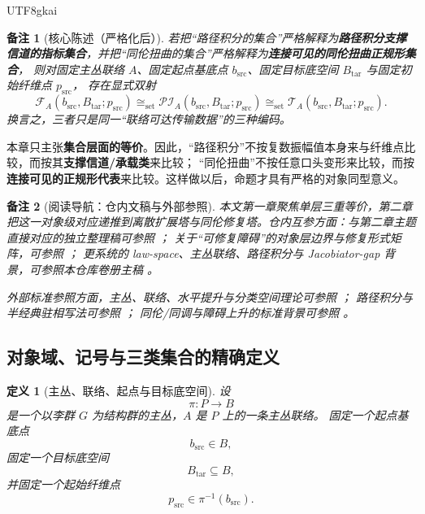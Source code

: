 \documentclass[12pt]{article}
\newtheorem{definition}{定义}[section]
\newtheorem{remark}{备注}[section]
\begin{document}
\begin{CJK*}{UTF8}{gkai}
\begin{remark}[核心陈述（严格化后）]
若把“路径积分的集合”严格解释为\textbf{路径积分支撑信道的指标集合}，并把“同伦扭曲的集合”严格解释为\textbf{连接可见的同伦扭曲正规形集合}，
则对固定主丛联络 $A$、固定起点基底点 $b_{\mathrm{src}}$、固定目标底空间 $B_{\mathrm{tar}}$ 与固定初始纤维点 $p_{\mathrm{src}}$，
存在显式双射
\[
  \mathcal{F}_{A}(b_{\mathrm{src}},B_{\mathrm{tar}};p_{\mathrm{src}})
  \cong_{\mathrm{set}}
  \mathcal{PI}_{A}(b_{\mathrm{src}},B_{\mathrm{tar}};p_{\mathrm{src}})
  \cong_{\mathrm{set}}
  \mathcal{T}_{A}(b_{\mathrm{src}},B_{\mathrm{tar}};p_{\mathrm{src}}).
\]
换言之，三者只是同一“联络可达传输数据”的三种编码。
\end{remark}

本章只主张\textbf{集合层面的等价}。因此，“路径积分”不按复数振幅值本身来与纤维点比较，而按其\textbf{支撑信道/承载类}来比较；
“同伦扭曲”不按任意口头变形来比较，而按\textbf{连接可见的正规形代表}来比较。这样做以后，命题才具有严格的对象同型意义。

\begin{remark}[阅读导航：仓内文稿与外部参照]
本文第一章聚焦单层三重等价，第二章把这一对象级对应递推到离散扩展塔与同伦修复塔。仓内互参方面：与第二章主题直接对应的独立整理稿可参照 \cite{RepoTex35Tower}；
关于“可修复障碍”的对象层边界与修复形式矩阵，可参照 \cite{RepoTex29RepairableObstruction}；
更系统的 law-space、主丛联络、路径积分与 Jacobiator-gap 背景，可参照本仓库卷册主稿 \cite{GaoZhengAppVol3}。

外部标准参照方面，主丛、联络、水平提升与分类空间理论可参照 \cite{KobayashiNomizu1963Foundations,Husemoller1994FibreBundles,Hall2015LieGroups}；
路径积分与半经典驻相写法可参照 \cite{FeynmanHibbs1965QMPI,Schulman2005Technique}；
同伦/同调与障碍上升的标准背景可参照 \cite{Hatcher2002AT,Whitehead1978Elements,Weibel1994HomologicalAlgebra,
  LodayVallette2012AlgebraicOperads}。
\end{remark}

\subsection{对象域、记号与三类集合的精确定义}
\label{subsec:tex36-objects}

\begin{definition}[主丛、联络、起点与目标底空间]
设
\[
  \pi:P\to B
\]
是一个以李群 $G$ 为结构群的主丛，$A$ 是 $P$ 上的一条主丛联络。
固定一个起点基底点
\[
  b_{\mathrm{src}}\in B,
\]
固定一个目标底空间
\[
  B_{\mathrm{tar}}\subseteq B,
\]
并固定一个起始纤维点
\[
  p_{\mathrm{src}}\in \pi^{-1}(b_{\mathrm{src}}).
\]
\end{definition}


\end{CJK*}
\end{document}
